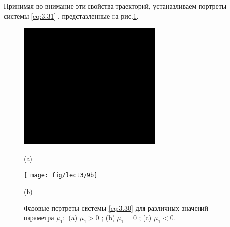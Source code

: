 Принимая во внимание эти свойства траекторий, устанавливаем портреты системы \eqref{eq:3.31} , представленные на рис.\ref{fig:3.9}.
        
\begin{figure}[h!]
        \centering
        \begin{minipage}{0.45\linewidth}
                \centering  
                \includegraphics[]{fig/lect3/9a}

                (a)
        \end{minipage}
        \begin{minipage}{0.45\linewidth}
                \centering  
                \texttt{[image: fig/lect3/9b]}

                (b)      
        \end{minipage}
          \label{fig:3.9}
        \caption{Фазовые портреты системы \eqref{eq:3.30}  для различных значений параметра $\mu_1:$
        (a) $\mu_1>0$ ; (b) $\mu_1=0$ ; (c) $\mu_1<0$.}
\end{figure}
